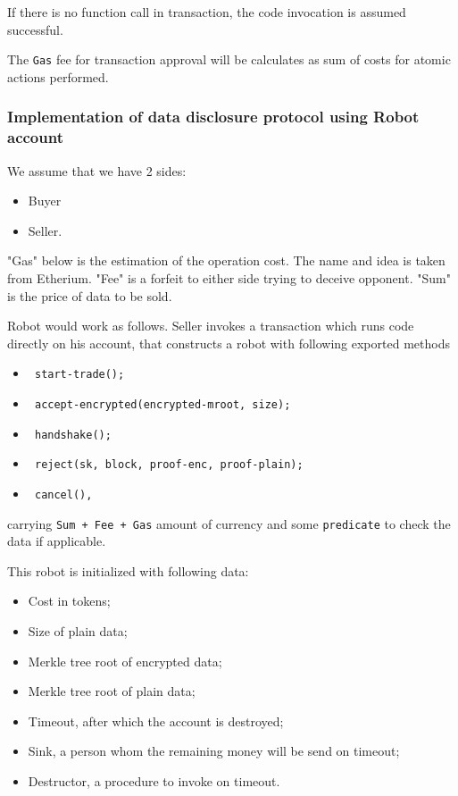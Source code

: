 If there is no function call in transaction, the code invocation is assumed successful.

The \verb|Gas| fee for transaction approval will be calculates as sum of costs for atomic actions performed.

\subsubsection{Implementation of data disclosure protocol using Robot account}

We assume that we have 2 sides:
\begin{itemize}
  \item Buyer
  \item Seller.
\end{itemize}

"Gas" below is the estimation of the operation cost. The name and idea is taken from Etherium.
"Fee" is a forfeit to either side trying to deceive opponent.
"Sum" is the price of data to be sold.

Robot would work as follows. Seller invokes a transaction which runs code directly on his account, that constructs a robot with following exported methods

\begin{itemize}
  \item \begin{verbatim} start-trade(); \end{verbatim}
  \item \begin{verbatim} accept-encrypted(encrypted-mroot, size); \end{verbatim}
  \item \begin{verbatim} handshake(); \end{verbatim}
  \item \begin{verbatim} reject(sk, block, proof-enc, proof-plain); \end{verbatim}
  \item \begin{verbatim} cancel(), \end{verbatim}
\end{itemize}
carrying \verb|Sum + Fee + Gas| amount of currency and some \verb|predicate| to check the data if applicable.

This robot is initialized with following data:
\begin{itemize}
  \item Cost in tokens;
  \item Size of plain data;
  \item Merkle tree root of encrypted data;
  \item Merkle tree root of plain data;
  \item Timeout, after which the account is destroyed;
  \item Sink, a person whom the remaining money will be send on timeout;
  \item Destructor, a procedure to invoke on timeout.
\end{itemize}

